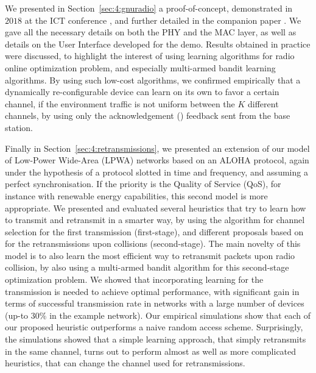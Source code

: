 We presented in Section~\ref{sec:4:gnuradio} a proof-of-concept, demonstrated in $2018$ at the ICT conference \cite{Besson2018ICT}, and further detailed in the companion paper \cite{Besson2019WCNC}.
We gave all the necessary details on both the PHY and the MAC layer, as well as details on the User Interface developed for the demo.
Results obtained in practice were discussed, to highlight the interest of using learning algorithms for radio online optimization problem, and especially multi-armed bandit learning algorithms.
%
By using such low-cost algorithms, we confirmed empirically that a dynamically re-configurable device can learn on its own to favor a certain channel, if the environment traffic is not uniform between the $K$ different channels, by using only the acknowledgement (\Ack) feedback sent from the base station.


Finally in Section~\ref{sec:4:retransmissions}, we presented an extension of our model of Low-Power Wide-Area (LPWA) networks based on an ALOHA protocol, again under the hypothesis of a protocol slotted in time and frequency, and assuming a perfect synchronisation.
If the priority is the Quality of Service (QoS), for instance with renewable energy capabilities, this second model is more appropriate.
We presented and evaluated several heuristics that try to learn how to transmit and retransmit in a smarter way, by using the \UCB{} algorithm for channel selection for the first transmission (first-stage), and different proposals based on \UCB{} for the retransmissions upon collisions (second-stage).
The main novelty of this model is to also learn the most efficient way to retransmit packets upon radio collision, by also using a multi-armed bandit algorithm for this second-stage optimization problem.
%
We showed that incorporating learning for the transmission is needed to achieve optimal performance, with significant gain in terms of successful transmission rate in networks with a large number of devices (up-to $30\%$ in the example network).
Our empirical simulations show that each of our proposed heuristic outperforms a naive random access scheme.
Surprisingly, the simulations showed that a simple \UCB{} learning approach, that simply retransmits in the same channel, turns out to perform almost as well as more complicated heuristics, that can change the channel used for retransmissions.


